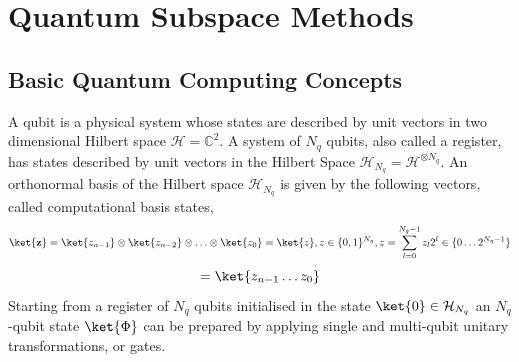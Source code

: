 \documentclass[12pt, oneside]{book}
\theoremstyle{definition}
\theoremstyle{definition}
\theoremstyle{remark}
\begin{document}
\chapter{Quantum Subspace Methods}
\section{Basic Quantum Computing Concepts}
A qubit is a physical system whose states are described by unit vectors in two dimensional Hilbert space $\mathcal{H} = \mathbb{C}^2$. A system of $N_q$ qubits, also called a register, has states described by unit vectors in the Hilbert Space $\mathcal{H}_{N_q}=\mathcal{H}^{\otimes N_q}$. An orthonormal basis of the Hilbert space $\mathcal{H}_{N_q}$ is given by the following vectors, called computational basis states,
\[
\ket{\mathbf{z}}=\ket{z_{n-1}}\otimes \ket{z_{n-2}} \otimes \ldots \otimes \ket{z_0}=\ket{z}, z\in \{0,1\}^{N_q}, z=\sum_{l=0}^{N_q-1} z_l2^l \in \{0 \ldots 2^{N_q-1}\}
\]
\[=\ket{z_{n-1}\ldots z_0}\]
Starting from a register of $N_q$ qubits initialised in the state $\ket{0} \in \mathcal{H}_{N_q}$ an $N_q$-qubit state $\ket{\Phi}$ can be prepared by applying single and multi-qubit unitary transformations, or gates.
\end{document}
